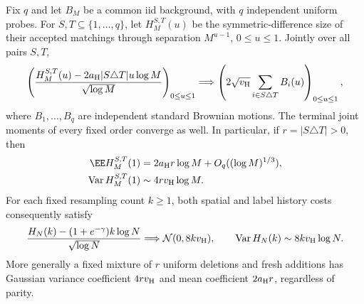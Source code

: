 \documentclass[11pt,letterpaper]{article}
\begin{document}
\begin{theorem}
\label{thm:fixed-edit-history-CLT}
Fix $q$ and let $B_M$ be a common iid background, with $q$
independent uniform probes. For $S,T\subseteq\{1,\ldots,q\}$,
let $H_M^{S,T}(u)$ be the symmetric-difference size of their
accepted matchings through separation $M^{u-1}$, $0\le u\le1$.
Jointly over all pairs $S,T$,
\begin{equation}\label{eq:fixed-family-history-FCLT}
 \left(\frac{H_M^{S,T}(u)-2a_{\rm H}|S\triangle T|u\log M}
                  {\sqrt{\log M}}\right)_{0\le u\le1}
 \Longrightarrow
 \left(2\sqrt{v_{\rm H}}\sum_{i\in S\triangle T}B_i(u)
                                      \right)_{0\le u\le1},
\end{equation}
where $B_1,\ldots,B_q$ are independent standard Brownian motions.
The terminal joint moments of every fixed order converge as well.
In particular, if $r=|S\triangle T|>0$, then
\begin{align}
 \EE H_M^{S,T}(1)&=2a_{\rm H}r\log M+O_q((\log M)^{1/3}),
                                      \label{eq:fixed-edit-mean-rate}\\
 \operatorname{Var}H_M^{S,T}(1)&\sim4r v_{\rm H}\log M.
                                      \label{eq:fixed-edit-variance}
\end{align}
For each fixed resampling count $k\ge1$, both spatial and label
history costs consequently satisfy
\begin{equation}\label{eq:fixed-resampling-history-CLT}
 \frac{H_N(k)-(1+e^{-\gamma})k\log N}{\sqrt{\log N}}
           \Longrightarrow\mathcal N(0,8k v_{\rm H}),
 \qquad \operatorname{Var}H_N(k)\sim8k v_{\rm H}\log N.
\end{equation}
More generally a fixed mixture of $r$ uniform deletions and fresh
additions has Gaussian variance coefficient $4r v_{\rm H}$ and
mean coefficient $2a_{\rm H}r$, regardless of parity.
\end{theorem}
\end{document}
